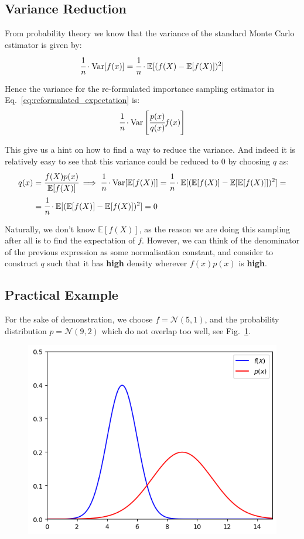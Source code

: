 \documentclass[12pt,a4paper]{article}
\begin{document}
\subsection{Variance Reduction}
From probability theory we know that the variance of the standard Monte Carlo estimator is given by:
\begin{equation}
\cfrac{1}{n}\cdot\text{Var}[f(x)] = \cfrac{1}{n}\cdot\mathbb{E}[(f(X)-\mathbb{E}[f(X)])^2]
\end{equation}

Hence the variance for the re-formulated importance sampling estimator in Eq.~\ref{eq:reformulated_expectation} is:
\begin{equation}
\cfrac{1}{n}\cdot\text{Var}\left[\cfrac{p(x)}{q(x)}f(x)\right]
\end{equation}

This give us a hint on how to find a way to reduce the variance. And indeed it is relatively easy to see that this variance could be reduced to 0 by choosing $q$ as:
\begin{equation}
\begin{aligned}
q(x)&=\cfrac{f(X)p(x)}{\mathbb{E}[f(X)]} \implies \cfrac{1}{n}\cdot\text{Var}[\mathbb{E}[f(X)]] = \cfrac{1}{n}\cdot\mathbb{E}[(\mathbb{E}[f(X)]-\mathbb{E}[\mathbb{E}[f(X)]])^2]=\\
&=\cfrac{1}{n}\cdot\mathbb{E}[(\mathbb{E}[f(X)]-\mathbb{E}[f(X)])^2] = 0
\end{aligned}
\end{equation}

Naturally, we don’t know $\mathbb{E}[f(X)]$, as the reason we are doing this sampling after all is to find the expectation of $f$.
However, we can think of the denominator of the previous expression as some normalisation constant, and consider to construct $q$ such that it has \textbf{high} density wherever $f(x)p(x)$ is \textbf{high}.

\subsection{Practical Example}
For the sake of demonstration, we choose $f=\mathcal{N}(5, 1)$, and the probability distribution $p=\mathcal{N}(9,2)$ which do not overlap too well, see Fig.~\ref{fig:f_and_p}.
\begin{figure}[htbp]
\begin{center}
\includegraphics[width=0.5\linewidth]{addons/f_and_p}
\end{center}
\label{fig:f_and_p}
\end{figure}
\end{document}

